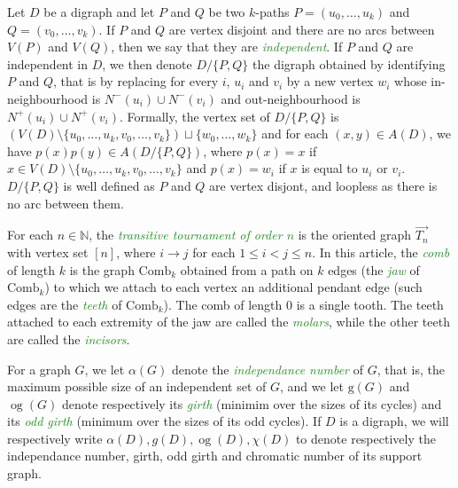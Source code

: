 \documentclass[11pt,a4aper]{article}
\renewcommand{\leq}{\leqslant}
\DeclareRobustCommand*{\ora}{\overrightarrow}
\DeclareMathOperator{\og}{og}
\newcommand*{\orTn}{\ora{T_n}}
\newcommand*{\Comb}{\mathrm{Comb}}
\newcommand{\defin}[1]{\emph{\textcolor{ForestGreen}{#1}}}
\begin{document}
Let $D$ be a digraph and let $P$ and $Q$ be two $k$-paths
$P = (u_0,\ldots, u_k)$ and $Q = (v_0,\ldots, v_k)$. If
$P$ and $Q$ are
vertex disjoint and there are no arcs between $V(P)$ and $V(Q)$, then we say that they are \defin{independent}. If $P$ and $Q$ are independent in $D$, 
we then denote $D / \{P,Q\}$ the digraph obtained by identifying $P$ and $Q$, that
is by replacing for every $i$, $u_i$ and $v_i$ by a new vertex $w_i$ whose
in-neighbourhood is $N^-(u_i) \cup N^-(v_i)$ and out-neighbourhood is
$N^+(u_i) \cup N^+(v_i)$. Formally, the vertex set of $D/\{P,Q\}$ is
$(V(D) \setminus \{u_0,\ldots,u_k,v_0,\ldots,v_k\}) \sqcup \{w_0, \ldots, w_k\}$
and for each $(x,y) \in A(D)$, we have $p(x)p(y) \in A(D/\{P,Q\})$, where $p(x)=x$
if $x \in V(D) \setminus \{u_0,\ldots,u_k,v_0,\ldots,v_k\}$ and $p(x) = w_i$ if
$x$ is equal to $u_i$ or $v_i$. 
$D/\{P,Q\}$ is well defined as $P$ and $Q$ are vertex disjont, and loopless 
as there is no arc between them. 
% 

For each $n\in \mathbb N$, the \defin{transitive tournament of order $n$} is the
oriented graph $\orTn$ with vertex set $[n]$, where $i\to j$ for
each $1\leq i<j\leq n$. In this article, the \defin{comb} of length $k$ is the
graph $\Comb_k$ obtained from a path on $k$ edges (the \defin{jaw} of $\Comb_k$)
to which we attach to each vertex an additional pendant edge (such edges are the
\defin{teeth} of $\Comb_k$). The comb of length 0 is a single tooth. The teeth
attached to each extremity of the jaw are called the \defin{molars},
while the other teeth are called the \defin{incisors}.
 
For a graph $G$, we let $\alpha(G)$ denote the \defin{independance number} of $G$, that is, the maximum possible size of an
independent set of $G$, and we let $\mathrm g(G)$ and $\og(G)$ denote
respectively its \defin{girth} (minimim over the sizes of its cycles) and its
\defin{odd girth} (minimum over the sizes of its odd cycles). If $D$ is a
digraph, we will respectively write $\alpha(D), g(D), \og(D), \chi(D)$ to denote respectively the independance number, girth, odd girth and chromatic number of its support
graph.
\end{document}
